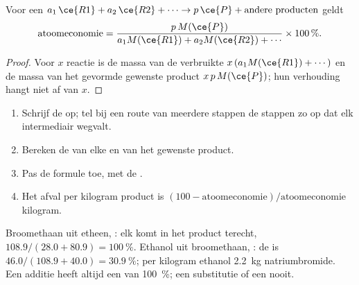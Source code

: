 \begin{proposition}\label{prop:g12:synthesis-strategy:atom-economy}
Voor een  $a_1\,\ce{R1} + a_2\,\ce{R2} + \cdots \rightarrow
p\,\ce{P} + \text{andere producten}$ geldt
\[
  \text{atoomeconomie} =
  \frac{p\,M(\ce{P})}{a_1 M(\ce{R1}) + a_2 M(\ce{R2}) + \cdots}
  \times 100\,\% .
\]
\end{proposition}

\begin{proof}
Voor $x$  reactie is de massa van de verbruikte 
$x\,(a_1 M(\ce{R1}) + \cdots)$ en de massa van het gevormde gewenste
product
$x\,p\,M(\ce{P})$; hun verhouding hangt niet af van $x$.
\end{proof}

\begin{method}\label{met:g12:synthesis-strategy:atom-economy}
\begin{enumerate}
  \item Schrijf de  op; tel bij een route van
        meerdere stappen de stappen zo op dat elk intermediair wegvalt.
  \item Bereken de  van elke  en van het gewenste
        product.
  \item Pas de formule toe, met de .
  \item Het afval per kilogram product is
        $(100 - \text{atoomeconomie})/\text{atoomeconomie}$ kilogram.
\end{enumerate}
\end{method}

\begin{example}\label{ex:g12:synthesis-strategy:compare}
Broomethaan uit etheen, : elk  komt in het
product terecht,  $108.9/(28.0 + 80.9) = \qty{100}{\percent}$.
Ethanol uit broomethaan, : de
 is $46.0/(108.9 + 40.0) = \qty{30.9}{\percent}$; per
kilogram ethanol \qty{2.2}{kg} natriumbromide. Een additie heeft altijd
een  van \qty{100}{\percent}; een substitutie of een
 nooit.
\end{example}

